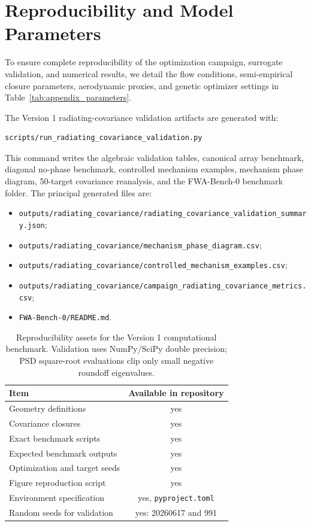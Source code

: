 \documentclass[11pt]{article}
\begin{document}
\clearpage

\section{Reproducibility and Model Parameters}
\label{sec:reproducibility}

To ensure complete reproducibility of the optimization campaign, surrogate validation, and numerical results, we detail the flow conditions, semi-empirical closure parameters, aerodynamic proxies, and genetic optimizer settings in Table~\ref{tab:appendix_parameters}.

The Version 1 radiating-covariance validation artifacts are generated with:
\begin{verbatim}
scripts/run_radiating_covariance_validation.py
\end{verbatim}
This command writes the algebraic validation tables, canonical array benchmark, diagonal no-phase benchmark, controlled mechanism examples, mechanism phase diagram, 50-target covariance reanalysis, and the FWA-Bench-0 benchmark folder. The principal generated files are:
\begin{itemize}
    \item \texttt{outputs/radiating\_covariance/radiating\_covariance\_validation\_summary.json};
	    \item \texttt{outputs/radiating\_covariance/mechanism\_phase\_diagram.csv};
	    \item \texttt{outputs/radiating\_covariance/controlled\_mechanism\_examples.csv};
	    \item \texttt{outputs/radiating\_covariance/campaign\_radiating\_covariance\_metrics.csv};
	    \item \texttt{FWA-Bench-0/README.md}.
\end{itemize}

\begin{table}[htbp]
\centering
\caption{Reproducibility assets for the Version 1 computational benchmark. Validation uses NumPy/SciPy double precision; PSD square-root evaluations clip only small negative roundoff eigenvalues.}
\label{tab:reproducibility_assets}
\begin{tabular}{lc}
\toprule
\textbf{Item} & \textbf{Available in repository} \\
\midrule
Geometry definitions & yes \\
Covariance closures & yes \\
Exact benchmark scripts & yes \\
Expected benchmark outputs & yes \\
Optimization and target seeds & yes \\
Figure reproduction script & yes \\
Environment specification & yes, \texttt{pyproject.toml} \\
Random seeds for validation & yes: 20260617 and 991 \\
\bottomrule
\end{tabular}
\end{table}
\end{document}
